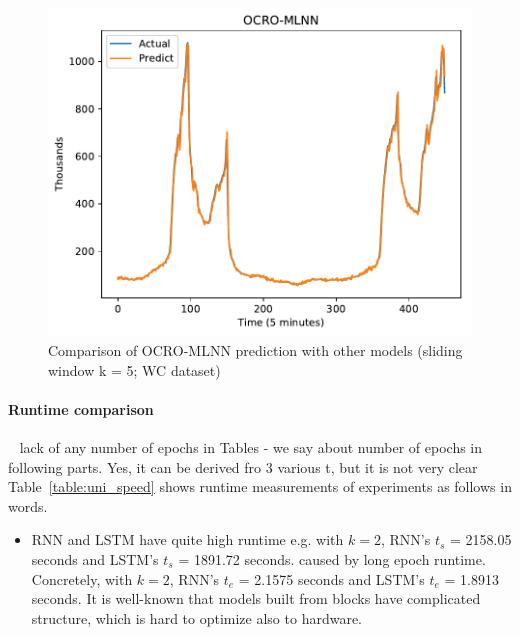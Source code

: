 \documentclass[review,3p,authoryear]{elsarticle}
\def \GN#1{\textcolor{tn_orange}{~#1}}			%
\begin{document}
{\begin{figure}[!ht]
\begin{minipage}[b]{0.33\linewidth}
    \includegraphics[width=0.9\linewidth]{images/pdf/predict/k5/wc_k5_ocro_mlnn.pdf} 
  \end{minipage} 
  \caption{Comparison of OCRO-MLNN prediction with other models (sliding window k = 5; WC dataset)} 
  \label{predict_wc_sliding5} 
\end{figure}


\paragraph{\textbf{Runtime comparison}} 
\GN{ lack of any number of epochs in Tables - we say about number of epochs in following parts. Yes, it can be derived fro 3 various t, but it is not very clear}
Table~\ref{table:uni_speed} shows runtime measurements of experiments as follows in words.
\begin{itemize}

\item RNN and LSTM have quite high runtime e.g. with $k = 2$, RNN's $t_s$ = 2158.05 seconds and LSTM's $t_s$ = 1891.72 seconds. 
caused by long epoch runtime. Concretely, with $k = 2$, RNN's $t_e$ = 2.1575 seconds and LSTM's $t_e$ = 1.8913 seconds.
It is well-known that models built from blocks have complicated structure, which is hard to optimize also to hardware.



\end{itemize}}
\end{document}
